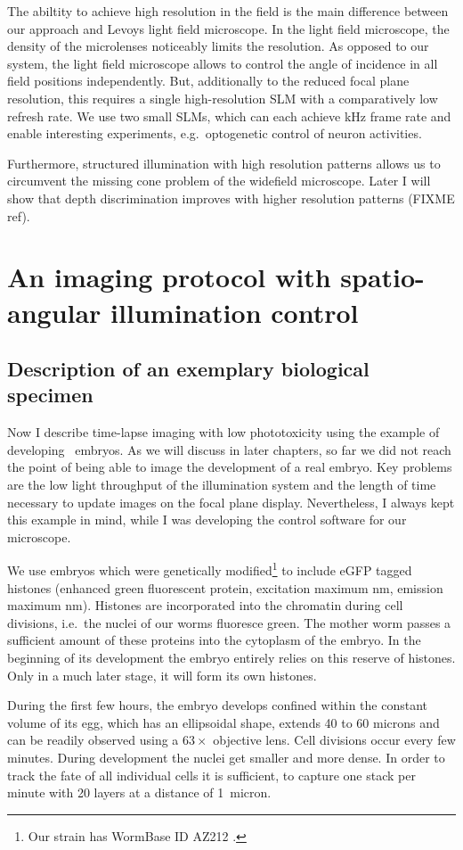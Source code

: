 The abiltity to achieve high resolution in the field is the main
difference between our approach and Levoys light field microscope.  In
the light field microscope, the density of the microlenses noticeably
limits the resolution. As opposed to our system, the light field
microscope allows to control the angle of incidence in all field
positions independently.  But, additionally to the reduced focal plane
resolution, this requires a single high-resolution SLM with a
comparatively low refresh rate. We use two small SLMs, which can each
achieve \unit[1]{kHz} frame rate and enable interesting experiments,
e.g.\ optogenetic control of neuron activities.

Furthermore, structured illumination with high resolution patterns
allows us to circumvent the missing cone problem of the widefield
microscope.  Later I will show that depth discrimination improves with
higher resolution patterns (FIXME ref).
\section{An imaging protocol with spatio-angular illumination control}
\subsection{Description of an exemplary biological specimen} 
Now I describe time-lapse imaging with low phototoxicity using the
example of developing \celegans\ embryos. As we will discuss in later
chapters, so far we did not reach the point of being able to image the
development of a real embryo. Key problems are the low light
throughput of the illumination system and the length of time necessary
to update images on the focal plane display. Nevertheless, I always
kept this example in mind, while I was developing the control software
for our microscope.

We use embryos which were genetically modified\footnote{Our strain has
WormBase ID AZ212 \citep{Praitis2001}.}  to include eGFP tagged histones (enhanced green
fluorescent protein, excitation maximum \unit[488]{nm}, emission
maximum \unit[509]{nm}). Histones are incorporated into the chromatin
during cell divisions, i.e.\ the nuclei of our worms fluoresce green.
The mother worm passes a sufficient amount of these proteins into the
cytoplasm of the embryo. In the beginning of its development the
embryo entirely relies on this reserve of histones. Only
in a much later stage, it will form its own histones.

During the first few hours, the embryo develops confined within the
constant volume of its egg, which has an ellipsoidal shape, extends 40
to 60 microns and can be readily observed using a $63\times$ objective
lens. Cell divisions occur every few minutes.  During development the
nuclei get smaller and more dense. In order to track the fate of all
individual cells it is sufficient, to capture one stack per minute
with 20 layers at a distance of 1~micron.
